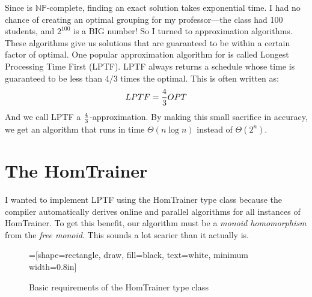 \documentclass[tikz]{tmr}
\newcommand{\prob}[1]{{\sc {#1}}}
\newcommand{\np}{{\ensuremath{\mathbb{NP}}}}
\newcommand\+{\mdoubleplus}
\begin{document}
Since \prob{Scheduling} is \np-complete, finding an exact solution takes exponential time.  
I had no chance of creating an optimal grouping for my professor---the class had 100 students, and $2^{100}$ is a BIG number!
So I turned to approximation algorithms.
These algorithms give us solutions that are guaranteed to be within a certain factor of optimal.
One popular approximation algorithm for \prob{Scheduling} is called Longest Processing Time First (LPTF).
LPTF always returns a schedule whose time is guaranteed to be less than $4/3$ times the optimal.
This is often written as:
$$
LPTF = {4\over3} OPT
$$
And we call LPTF a $4\over 3$-approximation.
By making this small sacrifice in accuracy, we get an algorithm that runs in time $\Theta(n\log n)$ instead of $\Theta(2^n)$.

\section{The \prob{Scheduling} HomTrainer}



I wanted to implement LPTF using the HomTrainer type class because the compiler automatically derives online and parallel algorithms for all instances of HomTrainer.
To get this benefit, our algorithm must be a \emph{monoid homomorphism} from the \emph{free monoid}.
This sounds a lot scarier than it actually is.

\begin{figure}[H]
\caption{Basic requirements of the HomTrainer type class}
\centering
{}=[shape=rectangle, draw, fill=black, text=white, minimum width=0.8in]
\vspace{0.15in}
\end{figure}
\end{document}
